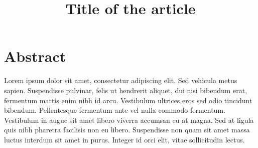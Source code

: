 \documentclass[draft,jgrga]{agutex}
\begin{document}

\title{Title of the article}









\section{Abstract}

Lorem ipsum dolor sit amet, consectetur adipiscing elit. Sed vehicula metus sapien. Suspendisse pulvinar, felis ut hendrerit aliquet, dui nisi bibendum erat, fermentum mattis enim nibh id arcu. Vestibulum ultrices eros sed odio tincidunt bibendum. Pellentesque fermentum ante vel nulla commodo fermentum. Vestibulum in augue sit amet libero viverra accumsan eu at magna. Sed at ligula quis nibh pharetra facilisis non eu libero. Suspendisse non quam sit amet massa luctus interdum sit amet in purus. Integer id orci elit, vitae sollicitudin lectus.



\end{document}
